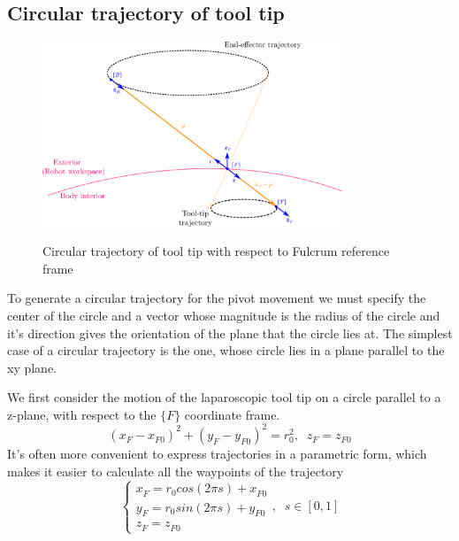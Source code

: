 \subsection{Circular trajectory of tool tip}

\begin{center}
\begin{figure}[H]
\centering
\includegraphics[width=0.8\textwidth]{images/circular-trajectory-wrt-fulcrum.png}\\
\caption{Circular trajectory of tool tip with respect to Fulcrum reference frame}
\end{figure}
\end{center}

To generate a circular trajectory for the pivot movement we must specify the center of the circle 
and a vector whose magnitude is the radius of the circle and it’s direction gives the orientation 
of the plane that the circle lies at. The simplest case of a circular trajectory is the one, 
whose circle lies in a plane parallel to the xy plane.


We first consider the motion of the laparoscopic tool tip on a circle parallel to a z-plane, with respect to the $\lbrace F \rbrace$ coordinate frame.
\begin{equation}
(x^{}_{F} - x^{}_{F0})^2 + (y^{}_{F} - y^{}_{F0})^2 = r_0^2, \;\; z^{}_{F} = z^{}_{F0}
\end{equation}
It's often more convenient to express trajectories in a parametric form, which makes it easier to calculate all the waypoints of the trajectory
\begin{equation}
\label{circle-z-plane-traj}
\begin{cases}
x^{}_{F} = r_0cos(2πs) + x^{}_{F0} \\
y^{}_{F} = r_0sin(2πs) + y^{}_{F0} \\
z^{}_{F} = z^{}_{F0}
\end{cases} ,
\;\;
s \in [0, 1]
\end{equation}

